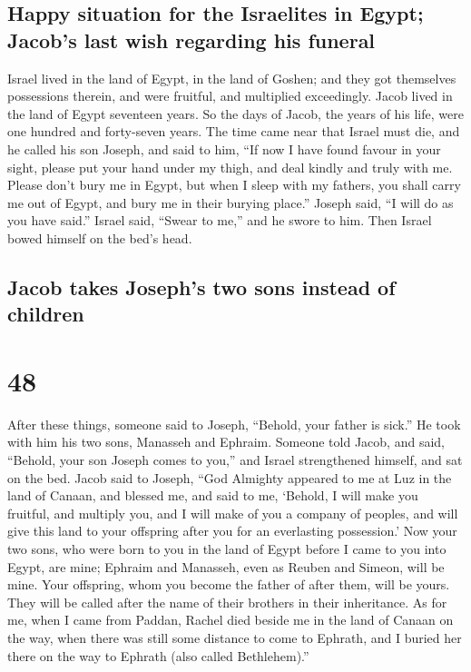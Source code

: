 \hypertarget{happy-situation-for-the-israelites-in-egypt-jacobs-last-wish-regarding-his-funeral}{%
\subsection{Happy situation for the Israelites in Egypt; Jacob's last
wish regarding his
funeral}\label{happy-situation-for-the-israelites-in-egypt-jacobs-last-wish-regarding-his-funeral}}

 Israel lived in the land of Egypt, in the land of
Goshen; and they got themselves possessions therein, and were fruitful,
and multiplied exceedingly.  Jacob lived in the land of
Egypt seventeen years. So the days of Jacob, the years of his life, were
one hundred and forty-seven years.  The time came near
that Israel must die, and he called his son Joseph, and said to him,
``If now I have found favour in your sight, please put your hand under
my thigh, and deal kindly and truly with me. Please don't bury me in
Egypt,  but when I sleep with my fathers, you shall carry
me out of Egypt, and bury me in their burying place.'' Joseph said, ``I
will do as you have said.''  Israel said, ``Swear to
me,'' and he swore to him. Then Israel bowed himself on the bed's head.

\hypertarget{jacob-takes-josephs-two-sons-instead-of-children}{%
\subsection{Jacob takes Joseph's two sons instead of
children}\label{jacob-takes-josephs-two-sons-instead-of-children}}

\hypertarget{section-47}{%
\section{48}\label{section-47}}

 After these things, someone said to Joseph, ``Behold,
your father is sick.'' He took with him his two sons, Manasseh and
Ephraim.  Someone told Jacob, and said, ``Behold, your son
Joseph comes to you,'' and Israel strengthened himself, and sat on the
bed.  Jacob said to Joseph, ``God Almighty appeared to me
at Luz in the land of Canaan, and blessed me,  and said to
me, `Behold, I will make you fruitful, and multiply you, and I will make
of you a company of peoples, and will give this land to your offspring
after you for an everlasting possession.'  Now your two
sons, who were born to you in the land of Egypt before I came to you
into Egypt, are mine; Ephraim and Manasseh, even as Reuben and Simeon,
will be mine.  Your offspring, whom you become the father
of after them, will be yours. They will be called after the name of
their brothers in their inheritance.  As for me, when I
came from Paddan, Rachel died beside me in the land of Canaan on the
way, when there was still some distance to come to Ephrath, and I buried
her there on the way to Ephrath (also called Bethlehem).''

